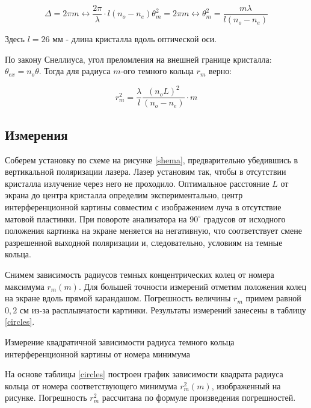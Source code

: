 	\[ \Delta = 2\pi m \leftrightarrow \frac{2\pi}{\lambda}\cdot l (n_o - n_e)\theta_m^2 = 2\pi m \leftrightarrow \theta_m^2 = \frac{m\lambda}{l(n_o - n_e)} \] 
	
	Здесь $l = 26$ мм - длина кристалла вдоль оптической оси.
	
	По закону Снеллиуса, угол преломления на внешней границе кристалла: $\theta_{ex} = n_o\theta$. Тогда для радиуса $m$-ого темного кольца $r_m$ верно: 

	\begin{equation}	
		r_m^2 = \frac{\lambda}{l} \frac{(n_oL)^2}{(n_o - n_e)} \cdot m
	\end{equation}
	
	\subsection{Измерения}
	
	Соберем установку по схеме на рисунке \ref{shema}, предварительно убедившись в вертикальной поляризации лазера. Лазер установим так, чтобы в отсутствии кристалла излучение через него не проходило. Оптимальное расстояние $L$ от экрана до центра кристалла определим экспериментально, центр интерференционной картины совместим с изображением луча в отсутствие матовой пластинки. При повороте анализатора на $90^\circ$ градусов от исходного положения картинка на экране меняется на негативную, что соответствует смене разрешенной выходной поляризации и, следовательно, условиям на темные кольца. 
	
	Снимем зависимость радиусов темных концентрических колец от номера максимума $r_m(m)$. Для большей точности измерений отметим положения колец на экране вдоль прямой карандашом. Погрешность величины $r_m$ примем равной $0,2$ см из-за расплывчатости картинки. Результаты измерений занесены в таблицу \ref{circles}. 
	
	\begin{table}[h]
		\centering
		
		\caption{Измерение квадратичной зависимости радиуса темного кольца интерференционной картины от номера минимума}
		\label{circles}
	\end{table}	
	
	На основе таблицы \ref{circles} построен график зависимости квадрата радиуса кольца от номера соответствующего минимума $r_m^2(m)$, изображенный на рисунке. Погрешность $r_m^2$ рассчитана по формуле произведения погрешностей. 
	
